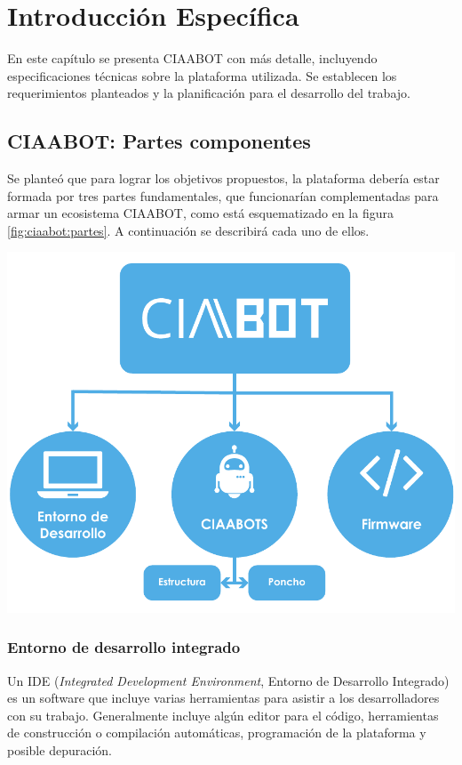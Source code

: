 \chapter{Introducción Específica} %

\label{Chapter2}
En este capítulo se presenta CIAABOT con más detalle, incluyendo especificaciones técnicas sobre la plataforma utilizada. Se establecen los requerimientos planteados y la planificación para el desarrollo del trabajo.

\section{CIAABOT: Partes componentes}
\label{sec:ciaabot:partes}
Se planteó que para lograr los objetivos propuestos, la plataforma debería estar formada por tres partes fundamentales, que funcionarían complementadas para armar un ecosistema CIAABOT, como está esquematizado en la figura \ref{fig:ciaabot:partes}. A continuación se describirá cada uno de ellos.

\begin{center}
    \includegraphics[scale=.8]{./Figures/ciaabot-partes.pdf}
    \label{fig:ciaabot:partes}
\end{center}


\subsection{Entorno de desarrollo integrado}
\label{subsec:ide}
Un IDE (\emph{Integrated Development Environment}, Entorno de Desarrollo Integrado) es un software que incluye varias herramientas para asistir a los desarrolladores con su trabajo. Generalmente incluye algún editor para el código, herramientas de construcción o compilación automáticas, programación de la plataforma y posible depuración.

